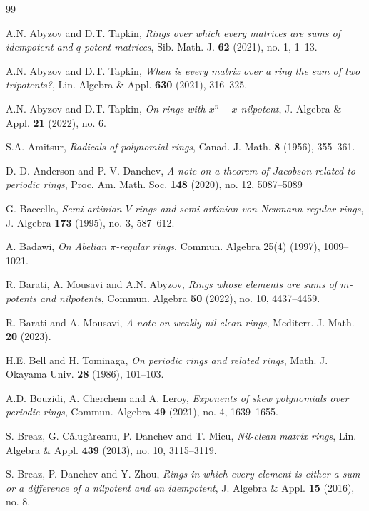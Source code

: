 \documentclass[12pt]{amsart}
\theoremstyle{definition}
\theoremstyle{remark}
\numberwithin{equation}{section}
\begin{document}
\begin{thebibliography}{99}


A.N. Abyzov and D.T. Tapkin, {\it Rings over which every matrices are sums of idempotent and $q$-potent matrices}, Sib. Math. J. \textbf{62} (2021), no. 1, 1--13.

A.N. Abyzov and D.T. Tapkin, {\it When is every matrix over a ring the sum of two tripotents?}, Lin. Algebra \& Appl. \textbf{630} (2021), 316--325.

A.N. Abyzov and D.T. Tapkin, {\it On rings with $x^n-x$ nilpotent}, J. Algebra \& Appl. \textbf{21} (2022), no. 6.

S.A. Amitsur, {\it Radicals of polynomial rings}, Canad. J. Math. \textbf{8} (1956), 355--361.

D. D. Anderson and P. V. Danchev, {\it A note on a theorem of Jacobson related to periodic rings}, Proc. Am. Math. Soc. \textbf{148} (2020), no. 12, 5087--5089

G. Baccella, {\it Semi-artinian $V$-rings and semi-artinian von Neumann regular rings}, J. Algebra \textbf{173} (1995), no. 3, 587--612.

A. Badawi, {\it On Abelian $\pi$-regular rings}, Commun. Algebra 25(4) (1997), 1009--1021. 

R. Barati, A. Mousavi and A.N. Abyzov, {\it Rings whose elements are sums of $m$-potents and nilpotents}, Commun. Algebra \textbf{50} (2022), no. 10, 4437--4459.

R. Barati and A. Mousavi, {\it A note on weakly nil clean rings}, Mediterr. J. Math. \textbf{20} (2023).

H.E. Bell and H. Tominaga, {\it On periodic rings and related rings}, Math. J. Okayama Univ. \textbf{28} (1986), 101--103.

A.D. Bouzidi, A. Cherchem and A. Leroy, {\it Exponents of skew polynomials over periodic rings}, Commun. Algebra  \textbf{49} (2021), no. 4, 1639--1655.

S. Breaz, G. C\v{a}lug\v{a}reanu, P. Danchev and T. Micu, {\it Nil-clean matrix rings}, Lin. Algebra \& Appl. \textbf{439} (2013), no. 10, 3115--3119.

S. Breaz, P. Danchev and Y. Zhou, {\it Rings in which every element is either a sum or a difference of a nilpotent and an idempotent}, J. Algebra \& Appl. \textbf{15} (2016), no. 8.


\end{thebibliography}
\end{document}
